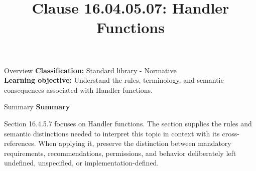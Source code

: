 \documentclass[10pt,letterpaper]{article}
\title{Clause 16.04.05.07: Handler Functions}
\author{}
\date{}
\begin{document}
\maketitle
\begin{CornellOverviewBox}{Overview}
\textbf{Classification:} Standard library - Normative\\[2pt]
\textbf{Learning objective:} Understand the rules, terminology, and semantic consequences associated with Handler functions.
\end{CornellOverviewBox}\begin{CornellSummaryBox}{Summary}
{\sffamily\bfseries\color{Accent} Summary}\par\vspace{3pt}Section 16.4.5.7 focuses on Handler functions. The section supplies the rules and semantic distinctions needed to interpret this topic in context with its cross-references. When applying it, preserve the distinction between mandatory requirements, recommendations, permissions, and behavior deliberately left undefined, unspecified, or implementation-defined.
\end{CornellSummaryBox}
\end{document}
